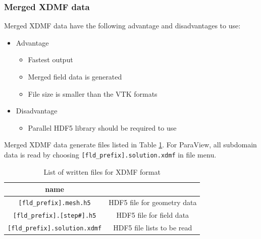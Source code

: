 \subsubsection{Merged XDMF data}
Merged XDMF data have the following advantage and disadvantages to use:
%
\begin{itemize}
\item Advantage
\begin{itemize} 
\item Fastest output
\item Merged field data is generated
\item File size is smaller than the VTK formats
\end{itemize}
\item Disadvantage
\begin{itemize} 
\item Parallel HDF5 library should be required to use
\end{itemize}
\end{itemize}
%
Merged XDMF data generate files listed in Table \ref{table:XDMF}. For ParaView, all subdomain data is read by choosing \verb|[fld_prefix].solution.xdmf| in file menu.
%
\begin{table}[htdp]
\caption{List of written files for XDMF format}
\begin{center} 
\begin{tabular}{|c|c|}
\hline
 name &  \\ \hline \hline
\verb|[fld_prefix].mesh.h5|  & HDF5 file for geometry data \\ \hline
\verb|[fld_prefix].[step#].h5|  &HDF5 file for field data   \\ \hline
\verb|[fld_prefix].solution.xdmf|  & HDF5 file lists to be read  \\ \hline
\end{tabular}
\end{center}
\label{table:XDMF}
\end{table}
%


